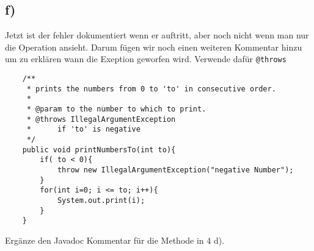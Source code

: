 \subsection*{f)}
	Jetzt ist der fehler dokumentiert wenn er auftritt, aber noch nicht wenn man nur die Operation ansieht. Darum fügen wir noch einen weiteren Kommentar hinzu um zu erklären wann die Exeption geworfen wird. Verwende dafür  \lstinline{@throws}
		 \begin{lstlisting}
	/**
	 * prints the numbers from 0 to 'to' in consecutive order.
	 * 
	 * @param to the number to which to print.
	 * @throws IllegalArgumentException
	 * 		if 'to' is negative
	 */
	public void printNumbersTo(int to){
		if( to < 0){
			throw new IllegalArgumentException("negative Number");	
		}
		for(int i=0; i <= to; i++){
			System.out.print(i);
		}
	}
		\end{lstlisting}
 Ergänze den Javadoc Kommentar für die Methode in 4 d).
\newpage